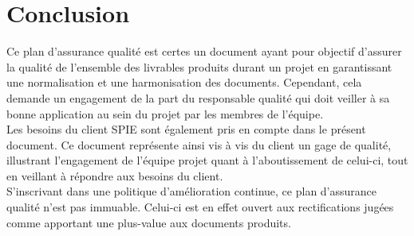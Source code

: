 \section{Conclusion}

Ce plan d’assurance qualité est certes un document ayant pour objectif d’assurer la qualité de l’ensemble des livrables produits durant un projet en garantissant une normalisation et une harmonisation des documents. Cependant, cela demande un engagement de la part du responsable qualité qui doit veiller à sa bonne application au sein du projet par les membres de l’équipe. \\

Les besoins du client SPIE sont également pris en compte dans le présent document. Ce document représente ainsi vis à vis du client un gage de qualité, illustrant l’engagement de l’équipe projet quant à l’aboutissement de celui-ci, tout en veillant à répondre aux besoins du client.  \\

S’inscrivant dans une politique d’amélioration continue, ce plan d’assurance qualité n’est pas immuable. Celui-ci est en effet ouvert aux rectifications jugées comme apportant une plus-value aux documents produits.